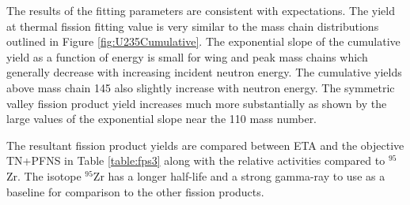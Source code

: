 The results of the fitting parameters are consistent with expectations. 
The yield at thermal fission fitting value is very similar to the mass chain distributions outlined in Figure \ref{fig:U235Cumulative}. 
The exponential slope of the cumulative yield as a function of energy is small for wing and peak mass chains which generally decrease with increasing incident neutron energy. 
The cumulative yields above mass chain 145 also slightly increase with neutron energy. 
The symmetric valley fission product yield increases much more substantially as shown by the large values of the exponential slope near the 110 mass number. 

The resultant fission product yields are compared between ETA and the objective TN+PFNS in Table \ref{table:fps3} along with the relative activities compared to $\mathrm{^{95}}$Zr. 
The isotope $\mathrm{^{95}}$Zr has a longer half-life and a strong gamma-ray to use as a baseline for comparison to the other fission products. 


